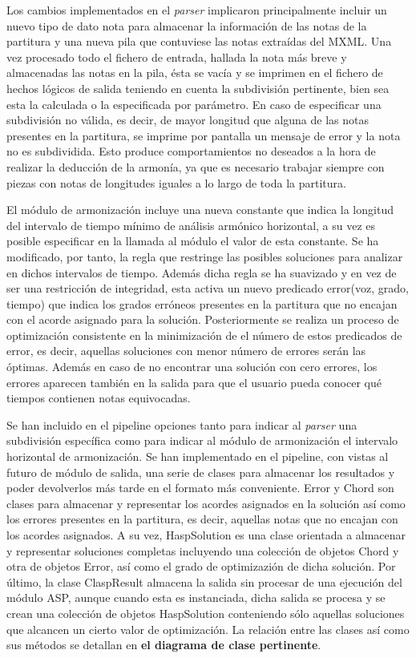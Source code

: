 Los cambios implementados en el \textit{parser} implicaron principalmente incluir un nuevo tipo de dato nota para almacenar la información de las notas de la partitura y una nueva pila que contuviese las notas extraídas del MXML. Una vez procesado todo el fichero de entrada, hallada la nota más breve y almacenadas las notas en la pila, ésta se vacía y se imprimen en el fichero de hechos lógicos de salida teniendo en cuenta la subdivisión pertinente, bien sea esta la calculada o la especificada por parámetro. En caso de especificar una subdivisión no válida, es decir, de mayor longitud que alguna de las notas presentes en la partitura, se imprime por pantalla un mensaje de error y la nota no es subdividida. Esto produce comportamientos no deseados a la hora de realizar la deducción de la armonía, ya que es necesario trabajar siempre con piezas con notas de longitudes iguales a lo largo de toda la partitura.

El módulo de armonización incluye una nueva constante que indica la longitud del intervalo de tiempo mínimo de análisis armónico horizontal, a su vez es posible especificar en la llamada al módulo el valor de esta constante. Se ha modificado, por tanto, la regla que restringe las posibles soluciones para analizar en dichos intervalos de tiempo. Además dicha regla se ha suavizado y en vez de ser una restricción de integridad, esta activa un nuevo predicado error(voz, grado, tiempo) que indica los grados erróneos presentes en la partitura que no encajan con el acorde asignado para la solución. Posteriormente se realiza un proceso de optimización consistente en la minimización de el número de estos predicados de error, es decir, aquellas soluciones con menor número de errores serán las óptimas. Además en caso de no encontrar una solución con cero errores, los errores aparecen también en la salida para que el usuario pueda conocer qué tiempos contienen notas equivocadas.

Se han incluido en el pipeline opciones tanto para indicar al \textit{parser} una subdivisión específica como para indicar al módulo de armonización el intervalo horizontal de armonización. Se han implementado en el pipeline, con vistas al futuro de módulo de salida, una serie de clases para almacenar los resultados y poder devolverlos más tarde en el formato más conveniente. Error y Chord son clases para almacenar y representar los acordes asignados en la solución así como los errores presentes en la partitura, es decir, aquellas notas que no encajan con los acordes asignados. A su vez, HaspSolution es una clase orientada a almacenar y representar soluciones completas incluyendo una colección de objetos Chord y otra de objetos Error, así como el grado de optimizazión de dicha solución. Por último, la clase ClaspResult almacena la salida sin procesar de una ejecución del módulo ASP, aunque cuando esta es instanciada, dicha salida se procesa y se crean una colección de objetos HaspSolution conteniendo sólo aquellas soluciones que alcancen un cierto valor de optimización. La relación entre las clases así como sus métodos se detallan en \textbf{el diagrama de clase pertinente}.

